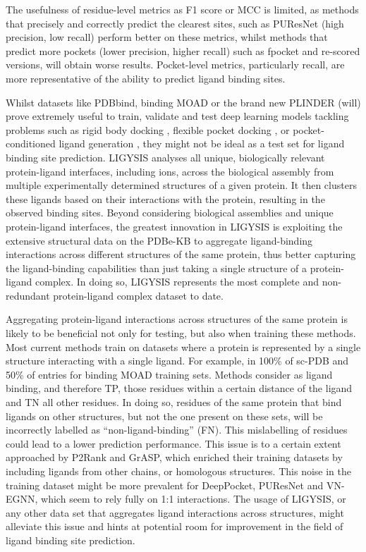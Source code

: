 The usefulness of residue-level metrics as F1 score or MCC is limited, as methods that precisely and correctly predict the clearest sites, such as PUResNet (high precision, low recall) perform better on these metrics, whilst methods that predict more pockets (lower precision, higher recall) such as fpocket and re-scored versions, will obtain worse results. Pocket-level metrics, particularly recall, are more representative of the ability to predict ligand binding sites.

Whilst datasets like PDBbind, binding MOAD or the brand new PLINDER \cite{DURAIRAJ_2024_PLINDER} (will) prove extremely useful to train, validate and test deep learning models tackling problems such as rigid body docking \cite{STARK_2022_EQUIBIND}, flexible pocket docking \cite{QIAO_2024_DGN}, or pocket-conditioned ligand generation \cite{SCHNEUING_2023_DIFFUSION}, they might not be ideal as a test set for ligand binding site prediction. LIGYSIS analyses all unique, biologically relevant protein-ligand interfaces, including ions, across the biological assembly from multiple experimentally determined structures of a given protein. It then clusters these ligands based on their interactions with the protein, resulting in the observed binding sites. Beyond considering biological assemblies and unique protein-ligand interfaces, the greatest innovation in LIGYSIS is exploiting the extensive structural data on the PDBe-KB to aggregate ligand-binding interactions across different structures of the same protein, thus better capturing the ligand-binding capabilities than just taking a single structure of a protein-ligand complex. In doing so, LIGYSIS represents the most complete and non-redundant protein-ligand complex dataset to date. 

Aggregating protein-ligand interactions across structures of the same protein is likely to be beneficial not only for testing, but also when training these methods. Most current methods train on datasets where a protein is represented by a single structure interacting with a single ligand. For example, in 100\% of sc-PDB and 50\% of entries for binding MOAD training sets. Methods consider as ligand binding, and therefore TP, those residues within a certain distance of the ligand and TN all other residues. In doing so, residues of the same protein that bind ligands on other structures, but not the one present on these sets, will be incorrectly labelled as ``non-ligand-binding'' (FN). This mislabelling of residues could lead to a lower prediction performance. This issue is to a certain extent approached by P2Rank and GrASP, which enriched their training datasets by including ligands from other chains, or homologous structures. This noise in the training dataset might be more prevalent for DeepPocket, PUResNet and VN-EGNN, which seem to rely fully on 1:1 interactions. The usage of LIGYSIS, or any other data set that aggregates ligand interactions across structures, might alleviate this issue and hints at potential room for improvement in the field of ligand binding site prediction.

